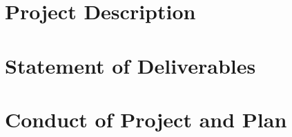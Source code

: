 \section{Project Description} \label{reqProDes}

\section{Statement of Deliverables} \label{reqDel}

\section{Conduct of Project and Plan} \label{reqConProPln}



